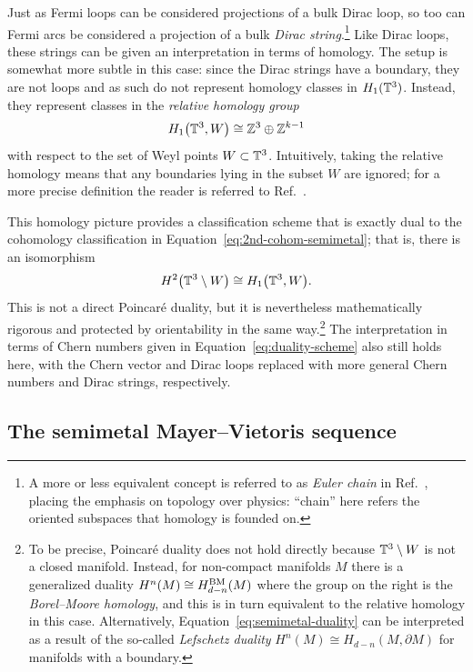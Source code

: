 Just as Fermi loops can be considered projections of a bulk Dirac loop, so too can Fermi arcs be considered a projection of a bulk \emph{Dirac string}.\footnote{
	A more or less equivalent concept is referred to as \emph{Euler chain} in Ref.~\cite{Mathai_math-review}, placing the emphasis on topology over physics: ``chain'' here refers the oriented subspaces that homology is founded on.}
Like Dirac loops, these strings can be given an interpretation in terms of homology. The setup is somewhat more subtle in this case: since the Dirac strings have a boundary, they are not loops and as such do not represent homology classes in $H_1(\mathbb{T}^3)$. Instead, they represent classes in the \emph{relative homology group}
\begin{equation}\label{eq:relative-homology}
	H_1\big(\mathbb{T}^3, W\big) \cong \mathbb{Z}^3\oplus\mathbb{Z}^{k-1}
\end{equation}
with respect to the set of Weyl points $W\subset\mathbb{T}^3$. Intuitively, taking the relative homology means that any boundaries lying in the subset $W$ are ignored; for a more precise definition the reader is referred to Ref.~\parencite[\S 2.1]{Hatcher_algebraic-topology}.

This homology picture provides a classification scheme that is exactly dual to the cohomology classification in Equation~\eqref{eq:2nd-cohom-semimetal}; that is, there is an isomorphism
\begin{equation}\label{eq:semimetal-duality}
	H^2\big(\mathbb{T}^3\setminus W\big) \cong H_1\big(\mathbb{T}^3, W\big).
\end{equation}
This is not a direct Poincar\'e duality, but it is nevertheless mathematically rigorous and protected by orientability in the same way.\footnote{
	To be precise, Poincar\'e duality does not hold directly because $\mathbb{T}^3\setminus W$ is not a closed manifold. Instead, for non-compact manifolds $M$ there is a generalized duality $H^n(M)\cong H_{d-n}^{\rm BM}(M)$ where the group on the right is the \emph{Borel--Moore homology}, and this is in turn equivalent to the relative homology in this case. Alternatively, Equation~\eqref{eq:semimetal-duality} can be interpreted as a result of the so-called \emph{Lefschetz duality} $H^n(M)\cong H_{d-n}(M, \partial M)$ for manifolds with a boundary.}
The interpretation in terms of Chern numbers given in Equation~\eqref{eq:duality-scheme} also still holds here, with the Chern vector and Dirac loops replaced with more general Chern numbers and Dirac strings, respectively.


\subsection{The semimetal Mayer--Vietoris sequence}\label{sec:Mayer-Vietoris}

